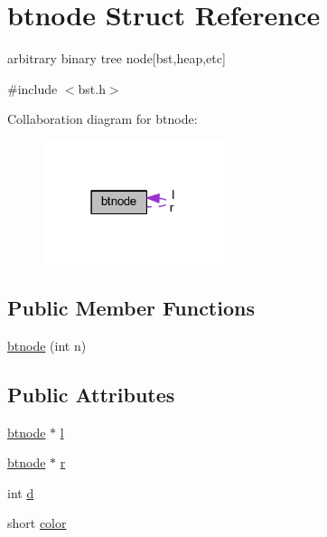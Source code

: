 \hypertarget{structbtnode}{\section{btnode Struct Reference}
\label{structbtnode}
}


arbitrary binary tree node\mbox{[}bst,heap,etc\mbox{]}  




{\ttfamily \#include $<$bst.\-h$>$}



Collaboration diagram for btnode\-:
\nopagebreak
\begin{figure}[H]
\begin{center}
\leavevmode
\includegraphics[width=150pt]{structbtnode__coll__graph}
\end{center}
\end{figure}
\subsection*{Public Member Functions}
\begin{DoxyCompactItemize}
\item 
\hyperlink{structbtnode_aa500392cc9dbda127e5cd1ff1297bdfa}{btnode} (int n)
\end{DoxyCompactItemize}
\subsection*{Public Attributes}
\begin{DoxyCompactItemize}
\item 
\hyperlink{structbtnode}{btnode} $\ast$ \hyperlink{structbtnode_af6ef69a154018945fa5e1a5287dfc4e0}{l}
\item 
\hyperlink{structbtnode}{btnode} $\ast$ \hyperlink{structbtnode_aad4b4a959992763c35c51f313c698002}{r}
\item 
int \hyperlink{structbtnode_aa78fe8dab99932fc364224bc83524771}{d}
\item 
short \hyperlink{structbtnode_a8cac175e3c667951b9346559f291da16}{color}
\end{DoxyCompactItemize}


